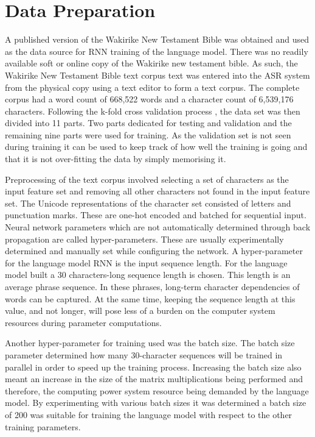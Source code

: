 \section{Data Preparation}
A published version of the Wakirike New Testament Bible was obtained and used as the data source for RNN training of the language model.  There was no readily available soft or online copy of the Wakirike new testament bible. As such, the Wakirike New Testament Bible text corpus text was entered into the ASR system from the physical copy using a text editor to form a text corpus.  The complete corpus had a word count of 668,522 words and a character count of 6,539,176 characters. Following the k-fold cross validation process \citep{geron2019hands}, the data set was then divided into 11 parts. Two parts dedicated for testing and validation and the remaining nine parts were used for training. As the validation set is not seen during training it can be used to keep track of how well the training is going and that it is not over-fitting the data by simply memorising it.

Preprocessing of the text corpus involved selecting a set of characters as the input feature set and removing all other characters not found in the input feature set.  The Unicode representations of the character set consisted of letters and punctuation marks.  These are one-hot encoded and batched for sequential input.  Neural network parameters which are not automatically determined through back propagation are called hyper-parameters.  These are usually experimentally determined and manually set while configuring the network.  A hyper-parameter for the language model RNN is the input sequence length.  For the language model built a 30 characters-long sequence length is chosen.  This  length is an average phrase sequence.  In these phrases, long-term character dependencies of words can be captured. At the same time, keeping the sequence length at this value, and not longer, will pose less of a burden on the computer system resources during parameter computations.  

Another hyper-parameter for training used was the batch size.  The batch size parameter determined how many 30-character sequences will be trained in parallel in order to speed up the training process.  Increasing the batch size also meant an increase in the size of the matrix multiplications being performed and therefore, the computing power system resource being demanded by the language model.  By experimenting with various batch sizes it was determined a batch size of 200 was suitable for training the language model with respect to the other training parameters.

